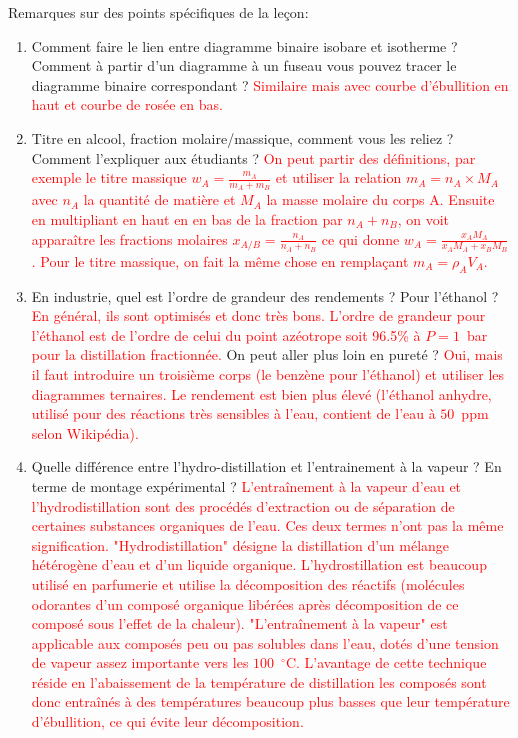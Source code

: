 \begin{reportBlock}{Remarques sur des points spécifiques de la leçon: }
\begin{enumerate}
    \item Comment faire le lien entre diagramme binaire isobare et isotherme ? Comment à partir d’un diagramme à un fuseau vous pouvez tracer le diagramme binaire correspondant ? \textcolor{red}{Similaire mais avec courbe d'ébullition en haut et courbe de rosée en bas.}
    \item Titre en alcool, fraction molaire/massique, comment vous les reliez ? Comment l'expliquer aux étudiants ? \textcolor{red}{On peut partir des définitions, par exemple le titre massique $w_A=\frac{m_A}{m_A+m_B}$ et utiliser la relation $m_A=n_A\times M_A$ avec $n_A$ la quantité de matière et $M_A$ la masse molaire du corps A. Ensuite en multipliant en haut en en bas de la fraction par $n_A+n_B$, on voit apparaître les fractions molaires $x_{A/B}=\frac{n_A}{n_A+n_B}$ ce qui donne $w_{A}=\frac{x_AM_A}{x_AM_A+x_BM_B}$. Pour le titre massique, on fait la même chose en remplaçant $m_A = \rho_A V_A$.}
    \item En industrie, quel est l'ordre de grandeur des rendements ? Pour l'éthanol ? \textcolor{red}{En général, ils sont optimisés et donc très bons. L'ordre de grandeur pour l'éthanol est de l'ordre de celui du point azéotrope soit 96.5\% à $P=1$~bar pour la distillation fractionnée.} On peut aller plus loin en pureté ? \textcolor{red}{Oui, mais il faut introduire un troisième corps (le benzène pour l'éthanol) et utiliser les diagrammes ternaires. Le rendement est bien plus élevé (l'éthanol anhydre, utilisé pour des réactions très sensibles à l'eau, contient de l'eau à $50$~ppm selon Wikipédia).}
    \item Quelle différence entre l'hydro-distillation et l’entrainement à la vapeur ? En terme de montage expérimental ? \textcolor{red}{L'entraînement à la vapeur d'eau et l'hydrodistillation sont des procédés d'extraction ou de séparation de certaines substances organiques de l'eau. Ces deux termes n'ont pas la même signification. "Hydrodistillation" désigne la distillation d’un mélange hétérogène d’eau et d’un liquide organique. L'hydrostillation est beaucoup utilisé en parfumerie et utilise la décomposition des réactifs (molécules odorantes d'un composé organique libérées après décomposition de ce composé sous l'effet de la chaleur). "L’entraînement à la vapeur" est applicable aux composés peu ou pas solubles dans l'eau, dotés d'une tension de vapeur assez importante vers les $100$~$^{\circ}$C. L’avantage de cette technique réside en l'abaissement de la température de distillation les composés sont donc entraînés à des températures beaucoup plus basses que leur température d’ébullition, ce qui évite leur décomposition.}

\end{enumerate}
\end{reportBlock}
